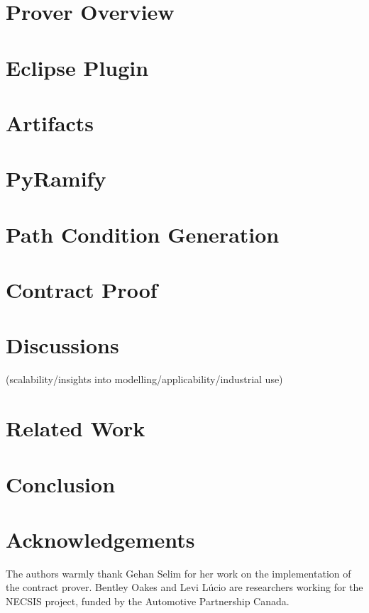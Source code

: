\documentclass[conference]{IEEEtran}
\begin{document}
\section{Prover Overview}
\label{sec:overview}
%


\section{Eclipse Plugin}
\label{sec:plugin}
%

\section{Artifacts}
\label{sec:artifacts}
%

\section{PyRamify}
\label{sec:pyramify}
%

\section{Path Condition Generation}
\label{sec:pc_gen}
%

\section{Contract Proof}
\label{sec:contact_proof}
%

\section{Discussions}
\label{sec:discussions}
%
 (scalability/insights into modelling/applicability/industrial use)

\section{Related Work}
\label{sec:related}
%

\section{Conclusion}
\label{sec:conclusion}
%

\section*{Acknowledgements}
The authors warmly thank Gehan Selim for her work on the
implementation of the contract prover. Bentley Oakes and Levi L\'ucio are
researchers working for the NECSIS project, funded by the Automotive Partnership
Canada. %



\end{document}
